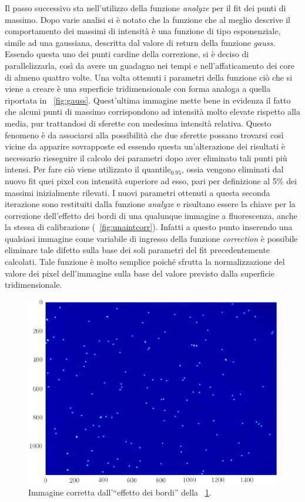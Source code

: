 Il passo successivo sta nell'utilizzo della funzione \textit{analyze} per il fit dei punti di massimo. 
Dopo varie analisi si è notato che la funzione che al meglio descrive il comportamento dei massimi di intensità è una funzione di tipo esponenziale, simile ad una gaussiana, descritta dal valore di return della funzione \textit{gauss}. 
Essendo questa uno dei punti cardine della correzione, si è deciso di parallelizzarla, così da avere un guadagno nei tempi e nell'affaticamento dei core di almeno quattro volte.
Una volta ottenuti i parametri della funzione ciò che si viene a creare è una superficie tridimensionale con forma analoga a quella riportata in \figurename~\ref{fig:gauss}. 
Quest'ultima immagine mette bene in evidenza il fatto che alcuni punti di massimo corrispondono ad intensità molto elevate rispetto alla media, pur trattandosi di sferette con medesima intensità relativa.
Questo fenomeno è da associarsi alla possibilità che due sferette possano trovarsi così vicine da apparire sovrapposte ed essendo questa un'alterazione dei risultati è necessario rieseguire il calcolo dei parametri dopo aver eliminato tali punti più intensi. 
Per fare ciò viene utilizzato il quantile$_{0.95}$, ossia vengono eliminati dal nuovo fit quei pixel con intensità superiore ad esso, pari per definizione al 5\% dei massimi inizialmente rilevati.
I nuovi parametri ottenuti a questa seconda iterazione sono restituiti dalla funzione \textit{analyze} e risultano essere la chiave per la correzione dell'effetto dei bordi di una qualunque immagine a fluorescenza, anche la stessa di calibrazione (\figurename~\ref{fig:unaintcorr}).
Infatti a questo punto inserendo una qualsiasi immagine come variabile di ingresso della funzione \textit{correction} è possibile eliminare tale difetto sulla base dei soli parametri del fit precedentemente calcolati. 
Tale funzione è molto semplice poiché sfrutta la normalizzazione del valore dei pixel dell'immagine sulla base del valore previsto dalla superficie tridimensionale.

\begin{figure}
 \centering
 \includegraphics[scale=1]{img/CAP3unaintcorr.png}
 \caption{\small{Immagine corretta dall'``effetto dei bordi'' della \figurename~\ref{fig:unaint}.}}
 \label{fig:unaint}
\end{figure}

